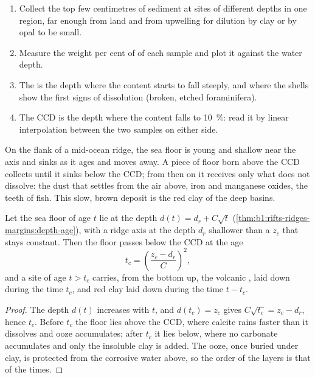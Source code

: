 \begin{method}\label{met:b1:chemical-biogenic-sediments:ccd}
\begin{enumerate}
  \item Collect the top few centimetres of sediment at sites of different depths
        in one region, far enough from land and from upwelling for dilution by
        clay or by opal to be small.
  \item Measure the weight per cent of  of each sample and plot it
        against the water depth.
  \item The  is the depth where the content starts to fall steeply,
        and where the shells show the first signs of dissolution (broken,
        etched foraminifera).
  \item The CCD is the depth where the content falls to \qty{10}{\%}: read it
        by linear interpolation between the two samples on either side.
\end{enumerate}
\end{method}

On the flank of a mid-ocean ridge, the sea floor is young and shallow near the
axis and sinks as it ages and moves away. A piece of floor born above the CCD
collects  until it sinks below the CCD; from then on it receives
only what does not dissolve: the dust that settles from the air above, iron and
manganese oxides, the teeth of fish. This slow, brown deposit is the red clay
of the deep basins.

\begin{proposition}\label{prop:b1:chemical-biogenic-sediments:flank}
Let the sea floor of age $t$ lie at the depth $d(t) = d_r + C\sqrt t$
(\cref{thm:b1:rifts-ridges-margins:depth-age}), with a ridge axis at the depth $d_r$
shallower than a  $z_c$ that stays constant. Then
the floor passes below the CCD at the age
\[
t_c = \left(\frac{z_c - d_r}{C}\right)^2 ,
\]
and a site of age $t > t_c$ carries, from the bottom up, the volcanic ,
 laid down during the time $t_c$, and red clay laid down during
the time $t - t_c$.
\end{proposition}

\begin{proof}
The depth $d(t)$ increases with $t$, and $d(t_c) = z_c$ gives $C\sqrt{t_c} =
z_c - d_r$, hence $t_c$. Before $t_c$ the floor lies above the CCD, where
calcite rains faster than it dissolves and ooze accumulates; after $t_c$ it
lies below, where no carbonate accumulates and only the insoluble clay is
added. The ooze, once buried under clay, is protected from the corrosive water
above, so the order of the layers is that of the times.
\end{proof}

